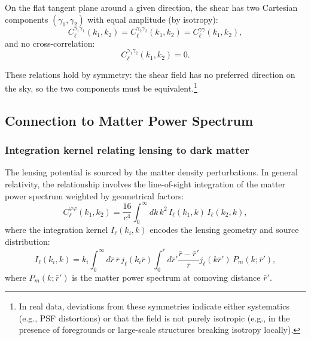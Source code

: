 On the flat tangent plane around a given direction, the shear has two Cartesian components $(\gamma_1, \gamma_2)$ with equal amplitude
(by isotropy):
\begin{equation}
C_\ell^{\gamma_1\gamma_1}(k_1, k_2) = C_\ell^{\gamma_2\gamma_2}(k_1, k_2) = C_\ell^{\gamma\gamma}(k_1, k_2),
\label{eq:cartesian_shear_equal}
\end{equation}
and no cross-correlation:
\begin{equation}
C_\ell^{\gamma_1\gamma_2}(k_1, k_2) = 0.
\label{eq:cartesian_shear_uncorrelated}
\end{equation}

These relations hold by symmetry: the shear field has no preferred direction on the sky, so the two components must be equivalent.\footnote{In
real data, deviations from these symmetries indicate either systematics (e.g., PSF distortions) or that the field is not purely isotropic
(e.g., in the presence of foregrounds or large-scale structures breaking isotropy locally).}

\subsection{Connection to Matter Power Spectrum}

\subsubsection{Integration kernel relating lensing to dark matter}

The lensing potential is sourced by the matter density perturbations. In general relativity, the relationship involves the line-of-sight
integration of the matter power spectrum weighted by geometrical factors:
\begin{equation}
C_\ell^{\varphi\varphi}(k_1, k_2) = \frac{16}{c^4} \int_0^\infty dk \, k^2 \, I_\ell(k_1, k) \, I_\ell(k_2, k),
\label{eq:potential_power_from_matter}
\end{equation}
where the integration kernel $I_\ell(k_i, k)$ encodes the lensing geometry and source distribution:
\begin{equation}
I_\ell(k_i, k) = k_i \int_0^\infty d\bar{r} \, \bar{r} \, j_\ell(k_i \bar{r}) 
\int_0^{\bar{r}} d\bar{r}' \frac{\bar{r} - \bar{r}'}{\bar{r}} j_\ell(k \bar{r}') \, P_m(k; \bar{r}'),
\label{eq:integration_kernel}
\end{equation}
where $P_m(k; \bar{r}')$ is the matter power spectrum at comoving distance $\bar{r}'$.

